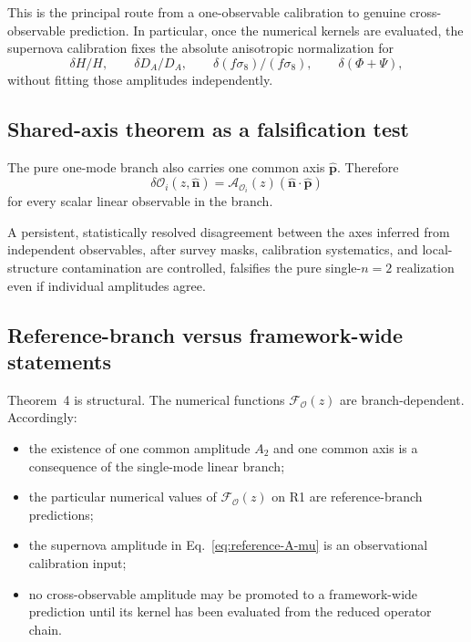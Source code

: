 This is the principal route from a one-observable calibration to genuine
cross-observable prediction.  In particular, once the numerical kernels are
evaluated, the supernova calibration fixes the absolute anisotropic
normalization for
\begin{equation}
\delta H/H,\qquad
\delta D_A/D_A,\qquad
\delta(f\sigma_8)/(f\sigma_8),\qquad
\delta(\Phi+\Psi),
\end{equation}
without fitting those amplitudes independently.

\subsection{Shared-axis theorem as a falsification test}

The pure one-mode branch also carries one common axis
$\hat{\mathbf p}$.  Therefore
\begin{equation}
\delta\mathcal O_i(z,\hat{\mathbf n})
=
\mathcal A_{\mathcal O_i}(z)
(\hat{\mathbf n}\!\cdot\!\hat{\mathbf p})
\end{equation}
for every scalar linear observable in the branch.

A persistent, statistically resolved disagreement between the axes inferred
from independent observables, after survey masks, calibration systematics,
and local-structure contamination are controlled, falsifies the pure
single-$n=2$ realization even if individual amplitudes agree.

\subsection{Reference-branch versus framework-wide statements}

Theorem~4 is structural.  The numerical functions
$\mathcal F_{\mathcal O}(z)$ are branch-dependent.  Accordingly:

\begin{itemize}
\item the existence of one common amplitude $A_2$ and one common axis is a
      consequence of the single-mode linear branch;
\item the particular numerical values of
      $\mathcal F_{\mathcal O}(z)$ on R1 are reference-branch predictions;
\item the supernova amplitude in
      Eq.~\eqref{eq:reference-A-mu} is an observational calibration input;
\item no cross-observable amplitude may be promoted to a framework-wide
      prediction until its kernel has been evaluated from the reduced
      operator chain.
\end{itemize}

